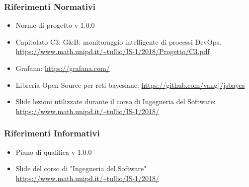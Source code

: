 		\subsubsection{Riferimenti Normativi}
		\begin{itemize}
			\item Norme di progetto v 1.0.0
			\item Capitolato C3: G\&B: monitoraggio intelligente di processi DevOps.\newline
			\url{https://www.math.unipd.it/~tullio/IS-1/2018/Progetto/C3.pdf}
			\item Grafana:\newline
			\url{https://grafana.com/}
			\item Libreria Open Source per reti bayesiane:\newline
			\url{https://github.com/vangj/jsbayes}
			\item Slide lezioni utilizzate durante il corso di Ingegneria del Software:\newline
			\url{https://www.math.unipd.it/~tullio/IS-1/2018/}
		\end{itemize}

		\subsubsection{Riferimenti Informativi}
			\begin{itemize}
			\item Piano di qualifica v 1.0.0
			\item Slide del corso di "Ingegneria del Software"\newline
			\url{https://www.math.unipd.it/~tullio/IS-1/2018/}
		\end{itemize}
				

\newpage
